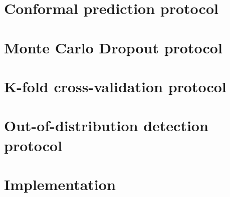 \section{Conformal prediction protocol}

\section{Monte Carlo Dropout protocol}

\section{K-fold cross-validation protocol}

\section{Out-of-distribution detection protocol}

\section{Implementation}
